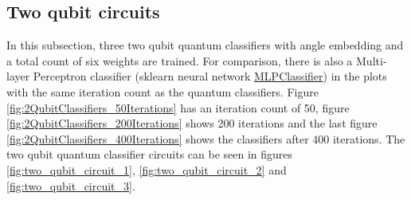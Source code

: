 \clearpage
\subsection{Two qubit circuits}
\label{subsection:two_qubit_circuits}
In this subsection, three two qubit quantum classifiers with angle embedding and a total count of six weights are trained. For comparison, there is also a Multi-layer Perceptron classifier (sklearn neural network \href{https://scikit-learn.org/stable/modules/generated/sklearn.neural_network.MLPClassifier.html}{MLPClassifier}) in the plots with the same iteration count as the quantum classifiers. Figure \ref{fig:2QubitClassifiers_50Iterations} has an iteration count of 50, figure \ref{fig:2QubitClassifiers_200Iterations} shows 200 iterations and the last figure \ref{fig:2QubitClassifiers_400Iterations} shows the classifiers after 400 iterations. The two qubit quantum classifier circuits can be seen in figures \ref{fig:two_qubit_circuit_1}, \ref{fig:two_qubit_circuit_2} and \ref{fig:two_qubit_circuit_3}.\\
\\

